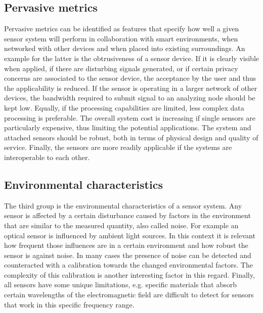 \subsection{Pervasive metrics}
Pervasive metrics can be identified as features that specify how well a given sensor system will perform in collaboration with smart environments, when networked with other devices and when placed into existing surroundings. An example for the latter is the obtrusiveness of a sensor device. If it is clearly visible when applied, if there are disturbing signals generated, or if certain privacy concerns are associated to the sensor device, the acceptance by the user and thus the applicability is reduced. If the sensor is operating in a larger network of other devices, the bandwidth required to submit signal to an analyzing node should be kept low. Equally, if the processing capabilities are limited, less complex data processing is preferable. The overall system cost is increasing if single sensors are particularly expensive, thus limiting the potential applications. The system and attached sensors should be robust, both in terms of physical design and quality of service. Finally, the sensors are more readily applicable if the systems are interoperable to each other.
\subsection{Environmental characteristics}
The third group is the environmental characteristics of a sensor system. Any sensor is affected by a certain disturbance caused by factors in the environment that are similar to the measured quantity, also called noise. For example an optical sensor is influenced by ambient light sources. In this context it is relevant how frequent those influences are in a certain environment and how robust the sensor is against noise. In many cases the presence of noise can be detected and counteracted with a calibration towards the changed environmental factors. The complexity of this calibration is another interesting factor in this regard. Finally, all sensors have some unique limitations, e.g. specific materials that absorb certain wavelengths of the electromagnetic field are difficult to detect for sensors that work in this specific frequency range.
